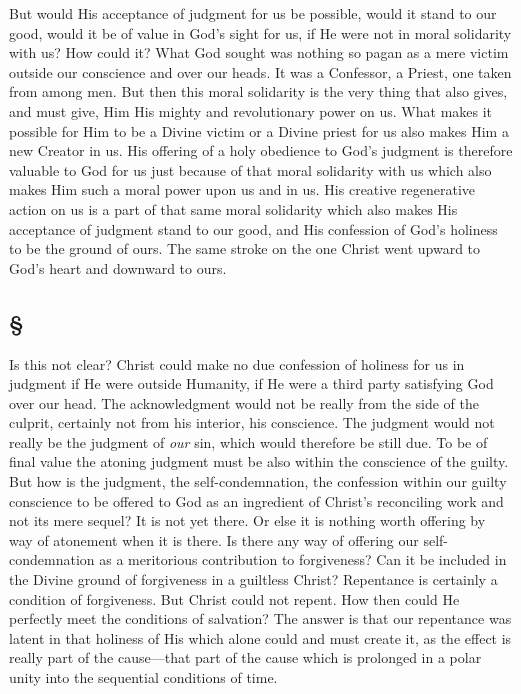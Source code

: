 \documentclass[draft]{ptfdoc}
\begin{document}
But would His acceptance of judgment for us 
be possible, would it stand to our good, would 
it be of value in God's sight for us, if He 
were not in moral solidarity with us? How 
could it? What God sought was nothing so 
pagan as a mere victim outside our conscience 
and over our heads. It was a Confessor, a 
Priest, one taken from among men. But then 
this moral solidarity is the very thing that 
also gives, and must give, Him His mighty and 
revolutionary power on us. What makes it 
possible for Him to be a Divine victim or a 
Divine priest for us also makes Him a new 
Creator in us. His offering of a holy obedience 
to God's judgment is therefore valuable to God 
for us just because of that moral solidarity 
with us which also makes Him such a moral 
power upon us and in us. His creative regenerative 
action on us is a part of that same 
moral solidarity which also makes His acceptance
of judgment stand to our good, and His 
confession of God's holiness to be the ground 
of ours. The same stroke on the one Christ 
went upward to God's heart and downward 
to ours. 

\subsection*{
\S
}

Is this not clear? Christ could make no due 
confession of holiness for us in judgment if 
He were outside Humanity, if He were a third 
party satisfying God over our head. The acknowledgment 
would not be really from the 
side of the culprit, certainly not from his interior, 
his conscience. The judgment would not 
really be the judgment of \textit{our} sin, which would 
therefore be still due. To be of final value 
the atoning judgment must be also within the 
conscience of the guilty. But how is the judgment, 
the self-condemnation, the confession within 
our guilty conscience to be offered to God 
as an ingredient of Christ's reconciling work 
and not its mere sequel? It is not yet there. 
Or else it is nothing worth offering by way of 
atonement when it is there. Is there any way of 
offering our self-condemnation as a meritorious 
contribution to forgiveness? Can it be included 
in the Divine ground of forgiveness in a guiltless 
Christ? Repentance is certainly a condition 
of forgiveness. But Christ could not repent. 
How then could He perfectly meet the conditions 
of salvation? The answer is that our 
repentance was latent in that holiness of His 
which alone could and must create it, as the 
effect is really part of the cause---that part of 
the cause which is prolonged in a polar unity 
into the sequential conditions of time. 
\end{document}
